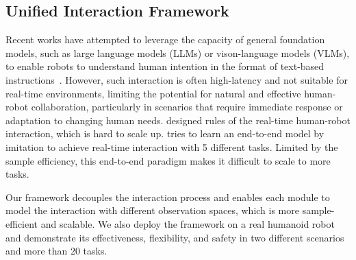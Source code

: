\subsection{Unified Interaction Framework}
Recent works have attempted to leverage the capacity of general foundation models, such as large language models (LLMs) or vison-language models (VLMs), to enable robots to understand human intention in the format of text-based instructions~\cite{tanneberg2024help}. 
However, such interaction is often high-latency and not suitable for real-time environments, limiting the potential for natural and effective human-robot collaboration, particularly in scenarios that require immediate response or adaptation to changing human needs. 
\citet{asfourARMAR6HighPerformanceHumanoid2019} designed rules of the real-time human-robot interaction, which is hard to scale up.
\citet{cardenas2024xbg} tries to learn an end-to-end model by imitation to achieve real-time interaction with 5 different tasks. Limited by the sample efficiency, this end-to-end paradigm makes it difficult to scale to more tasks.

Our framework decouples the interaction process and enables each module to model the interaction with different observation spaces, which is more sample-efficient and scalable. We also deploy the framework on a real humanoid robot and demonstrate its effectiveness, flexibility, and safety in two different scenarios and more than 20 tasks.
